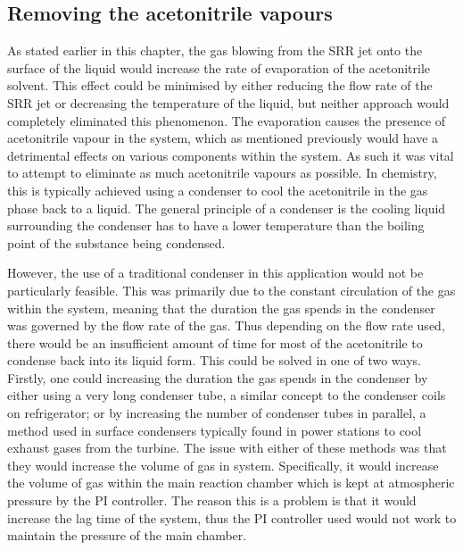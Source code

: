 \subsection{Removing the acetonitrile vapours}

As stated earlier in this chapter, the gas blowing from the SRR jet onto the surface of the liquid would increase the rate of evaporation of the acetonitrile solvent. This effect could be minimised by either reducing the flow rate of the SRR jet or decreasing the temperature of the liquid, but neither approach would completely eliminated this phenomenon. The evaporation causes the presence of acetonitrile vapour in the system, which as mentioned previously would have a detrimental effects on various components within the system. As such it was vital to attempt to eliminate as much acetonitrile vapours as possible. In chemistry, this is typically achieved using a condenser to cool the acetonitrile in the gas phase back to a liquid. The general principle of a condenser is the cooling liquid surrounding the condenser has to have a lower temperature than the boiling point of the substance being condensed. 

However, the use of a traditional condenser in this application would not be particularly feasible. This was primarily due to the constant circulation of the gas within the system, meaning that the duration the gas spends in the condenser was governed by the flow rate of the gas. Thus depending on the flow rate used, there would be an insufficient amount of time for most of the acetonitrile to condense back into its liquid form. This could be solved in one of two ways. Firstly, one could increasing the duration the gas spends in the condenser by either using a very long condenser tube, a similar concept to the condenser coils on refrigerator; or by increasing the number of condenser tubes in parallel, a method used in surface condensers typically found in power stations to cool exhaust gases from the turbine. The issue with either of these methods was that they would increase the volume of gas in system. Specifically, it would increase the volume of gas within the main reaction chamber which is kept at atmospheric pressure by the PI controller. The reason this is a problem is that it would increase the lag time of the system, thus the PI controller used would not work to maintain the pressure of the main chamber.

